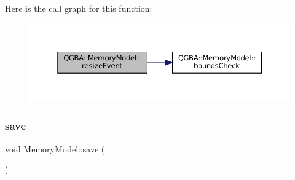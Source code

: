 Here is the call graph for this function\+:
\nopagebreak
\begin{figure}[H]
\begin{center}
\leavevmode
\includegraphics[width=350pt]{class_q_g_b_a_1_1_memory_model_aa4c1e00ada913a74ea17b1d81ebe6bd0_cgraph}
\end{center}
\end{figure}
\mbox{\label{class_q_g_b_a_1_1_memory_model_afa1d14d0c9d9fbac5d54d5808b75ca11}} 
\subsubsection{\texorpdfstring{save}{save}}
{\footnotesize\ttfamily void Memory\+Model\+::save (\begin{DoxyParamCaption}{ }\end{DoxyParamCaption})\hspace{0.3cm}{\ttfamily [slot]}}

